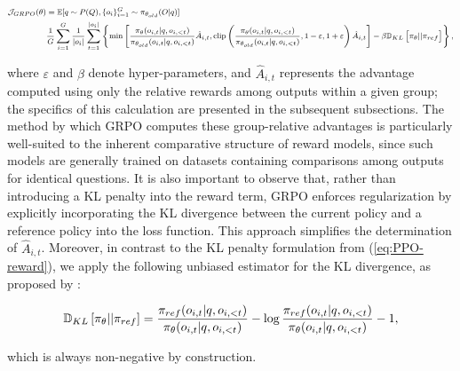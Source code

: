 \begin{itemize}[topsep=0pt]
\begin{equation}
\footnotesize
\begin{split}
    \mathcal{J}_{GRPO}(\theta) &= \mathbb{E}{[q \sim P(Q), \{o_i\}_{i=1}^G \sim \pi_{\theta_{old}}(O|q)]}  \\
    & \frac{1}{G}\sum_{i=1}^G\frac{1}{|o_i|} \sum_{t=1}^{|o_i|} \left\{ \min \left[ \frac{\pi_\theta(o_{i,t} | q, o_{i,<t})}{\pi_{\theta_{old}}(o_{i,t} | q, o_{i,<t})} \hat{A}_{i,t}, \text{clip} \left( \frac{\pi_\theta(o_{i,t} | q, o_{i,<t})}{\pi_{\theta_{old}}(o_{i,t} | q, o_{i,<t})}, 1 - \varepsilon, 1 + \varepsilon \right)  \hat{A}_{i,t} \right] - \beta \mathbb{D}_{KL}\left[\pi_{\theta} || \pi_{ref}\right]\right\} ,
\end{split}
\label{eq:GRPO-obj}
\end{equation}

where $\varepsilon$ and $\beta$ denote hyper-parameters, and $\hat{A}_{i,t}$ represents the advantage computed using only the relative rewards among outputs within a given group; the specifics of this calculation are presented in the subsequent subsections. The method by which GRPO computes these group-relative advantages is particularly well-suited to the inherent comparative structure of reward models, since such models are generally trained on datasets containing comparisons among outputs for identical questions. It is also important to observe that, rather than introducing a KL penalty into the reward term, GRPO enforces regularization by explicitly incorporating the KL divergence between the current policy and a reference policy into the loss function. This approach simplifies the determination of $\hat{A}_{i,t}$. Moreover, in contrast to the KL penalty formulation from (\ref{eq:PPO-reward}), we apply the following unbiased estimator for the KL divergence, as proposed by \citet{kl_approx}:

\begin{equation}
\small
    \mathbb{D}_{KL}\left[\pi_{\theta} || \pi_{ref}\right] = \frac{\pi_{ref}(o_{i,t}|q,o_{i,<t})}{\pi_{\theta}(o_{i,t}|q,o_{i,<t})}- \log\frac{\pi_{ref}(o_{i,t}|q,o_{i,<t})}{\pi_{\theta}(o_{i,t}|q,o_{i,<t})} - 1,
\end{equation}

which is always non-negative by construction.


\end{itemize}
